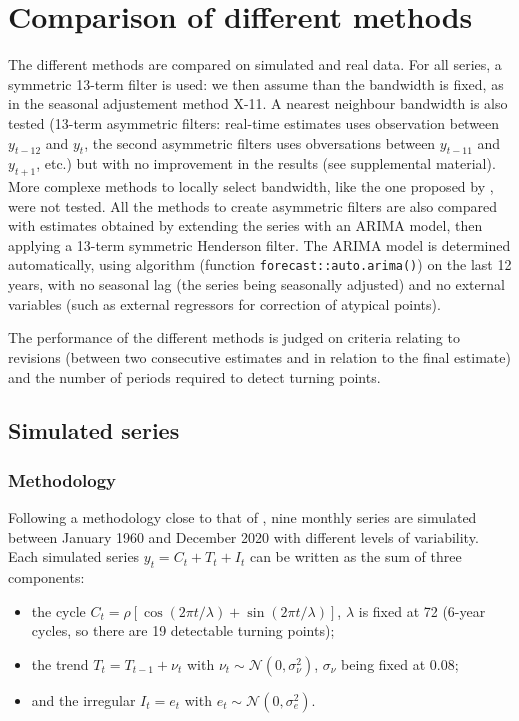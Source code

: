 \documentclass[
]{article}
\newcommand\1{\mathds{1}}
\begin{document}
\section{Comparison of different methods}\label{sec-comparison}

The different methods are compared on simulated and real data. For all
series, a symmetric 13-term filter is used: we then assume than the
bandwidth is fixed, as in the seasonal adjustement method X-11. A
nearest neighbour bandwidth is also tested (13-term asymmetric filters:
real-time estimates uses observation between \(y_{t-12}\) and \(y_{t}\),
the second asymmetric filters uses obversations between \(y_{t-11}\) and
\(y_{t+1}\), etc.) but with no improvement in the results (see
supplemental material). More complexe methods to locally select
bandwidth, like the one proposed by \textcite{fan1992variable}, were not
tested. All the methods to create asymmetric filters are also compared
with estimates obtained by extending the series with an ARIMA model,
then applying a 13-term symmetric Henderson filter. The ARIMA model is
determined automatically, using \textcite{autoarima} algorithm (function
\texttt{forecast::auto.arima()}) on the last 12 years, with no seasonal
lag (the series being seasonally adjusted) and no external variables
(such as external regressors for correction of atypical points).

The performance of the different methods is judged on criteria relating
to revisions (between two consecutive estimates and in relation to the
final estimate) and the number of periods required to detect turning
points.

\subsection{Simulated series}\label{simulated-series}

\subsubsection{Methodology}\label{methodology}

Following a methodology close to that of \textcite{DarneDagum2009}, nine
monthly series are simulated between January 1960 and December 2020 with
different levels of variability. Each simulated series
\(y_t= C_t+ T_t + I_t\) can be written as the sum of three components:

\begin{itemize}
\item
  the cycle
  \(C_t = \rho [\cos (2 \pi t / \lambda) +\sin (2 \pi t / \lambda)]\),
  \(\lambda\) is fixed at 72 (6-year cycles, so there are 19 detectable
  turning points);
\item
  the trend \(T_t = T_{t-1} + \nu_t\) with
  \(\nu_t \sim \mathcal{N}(0, \sigma_\nu^2)\), \(\sigma_\nu\) being
  fixed at \(0.08\);
\item
  and the irregular \(I_t = e_t\) with
  \(e_t \sim \mathcal{N}(0, \sigma_e^2)\).
\end{itemize}
\end{document}
